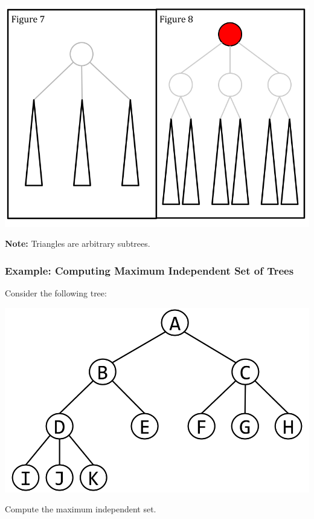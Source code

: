 \documentclass[letterpaper]{article}
\begin{document}
\begin{center}
    \includegraphics[scale=0.4]{assets/indep_set_trees_2.png}

    \textbf{Note:} Triangles are arbitrary subtrees. 
\end{center}


\subsubsection{Example: Computing Maximum Independent Set of Trees}
Consider the following tree: 
\begin{center}
    \includegraphics[scale=0.3]{assets/ind_set_ex_tree.png}
\end{center}
Compute the maximum independent set. 
\end{document}
